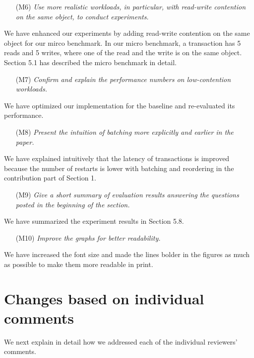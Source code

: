 \documentclass{article}
\begin{document}
\begin{itemize}
\item[(M6)] \emph{Use more realistic workloads, in particular, with read-write contention on the same object, to conduct experiments.}
\end{itemize}

We have enhanced our experiments by adding read-write contention on the same object for our mirco benchmark. In our micro benchmark, a transaction has 5 reads and 5 writes, where one of the read and the write is on the same object. Section 5.1 has described the micro benchmark in detail.

\begin{itemize}
\item[(M7)] \emph{Confirm and explain the performance numbers on low-contention workloads.}
\end{itemize}
We have optimized our implementation for the baseline and re-evaluated its performance.

\begin{itemize}
\item[(M8)] \emph{Present the intuition of batching more explicitly and earlier in the paper. }
\end{itemize}
We have explained intuitively that the latency of transactions is improved because the number of restarts is lower with batching and reordering in the contribution part of Section 1.

\begin{itemize}
\item[(M9)] \emph{Give a short summary of evaluation results answering the questions posted in the beginning of the section.}
\end{itemize}
We have summarized the experiment results in Section 5.8.

\begin{itemize}
\item[(M10)] \emph{Improve the graphs for better readability.}
\end{itemize}
We have increased the font size and made the lines bolder in the figures as much as possible to make them more readable in print.

\section{Changes based on individual comments}

We next explain in detail how we addressed each of the individual reviewers' comments.
\end{document}
